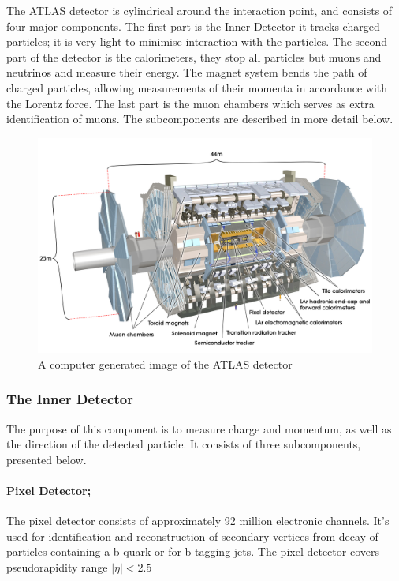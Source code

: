 \documentclass[12pt,a4paper]{article}
\numberwithin{equation}{section}
\begin{document}


The ATLAS detector is cylindrical around the interaction point, and consists of
four major components. The first part is the Inner Detector it tracks charged
particles; it is very light to minimise interaction with the particles. The
second part of the detector is the calorimeters, they stop all particles but
muons and neutrinos and measure their energy. The magnet system bends the path
of charged particles, allowing measurements of their momenta in accordance with
the Lorentz force. The last part is the muon chambers which serves as extra
identification of muons. The subcomponents are described in more detail below.

\begin{figure}[H]
	\centering
	\includegraphics[scale=0.1]{figures/atlas.jpg}
	\caption{A computer generated image of the ATLAS detector~\cite{detector}}\label{fig:detector}
\end{figure}

\subsubsection{The Inner Detector}
The purpose of this component is to measure charge and momentum, as well as the
direction of the detected particle. It consists of three subcomponents,
presented below.
\paragraph{Pixel Detector;}
The pixel detector consists of approximately 92 million electronic channels.
It's used for identification and reconstruction of secondary vertices from decay
of particles containing a b-quark or for b-tagging jets. The pixel detector
covers pseudorapidity range $|\eta| < 2.5 $
\end{document}

